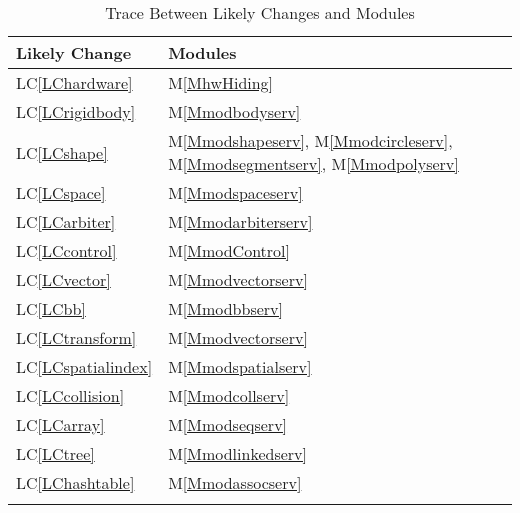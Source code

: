 \documentclass[12pt]{article}
\begin{document}
\begin{longtable}{l l}
\toprule
Likely Change & Modules
\\
\midrule
LC\ref{LChardware} & M\ref{MhwHiding}
\\
LC\ref{LCrigidbody} & M\ref{Mmodbodyserv}
\\
LC\ref{LCshape} & M\ref{Mmodshapeserv}, M\ref{Mmodcircleserv}, M\ref{Mmodsegmentserv}, M\ref{Mmodpolyserv}
\\
LC\ref{LCspace} & M\ref{Mmodspaceserv}
\\
LC\ref{LCarbiter} & M\ref{Mmodarbiterserv}
\\
LC\ref{LCcontrol} & M\ref{MmodControl}
\\
LC\ref{LCvector} & M\ref{Mmodvectorserv}
\\
LC\ref{LCbb} & M\ref{Mmodbbserv}
\\
LC\ref{LCtransform} & M\ref{Mmodvectorserv}
\\
LC\ref{LCspatialindex} & M\ref{Mmodspatialserv}
\\
LC\ref{LCcollision} & M\ref{Mmodcollserv}
\\
LC\ref{LCarray} & M\ref{Mmodseqserv}
\\
LC\ref{LCtree} & M\ref{Mmodlinkedserv}
\\
LC\ref{LChashtable} & M\ref{Mmodassocserv}
\\
\bottomrule
\caption{Trace Between Likely Changes and Modules}
\label{Table:TracBetwLikeChanandModu}
\end{longtable}
\end{document}
